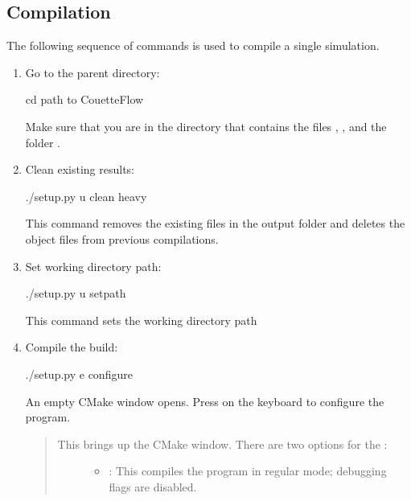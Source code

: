 \documentclass[letterpaper,10pt,english]{sphinxmanual}
\begin{document}
\subsection{Compilation}
\label{\detokenize{setup:compilation}}\label{\detokenize{setup:id2}}
The following sequence of commands is used to compile a single simulation.
\begin{enumerate}
\item {} 
Go to the parent directory:

\begin{sphinxVerbatim}[commandchars=\\\{\}]
\PYGZdl{} cd \PYGZlt{}path to \textbar{}CouetteFlow\textbar{}\PYGZgt{}
\end{sphinxVerbatim}

Make sure that you are in the directory that contains the files , , and the folder .

\item {} 
Clean existing results:

\begin{sphinxVerbatim}[commandchars=\\\{\}]
\PYGZdl{} ./setup.py \PYGZhy{}u clean heavy
\end{sphinxVerbatim}

This command removes the existing files in the output folder  and deletes the object files from previous compilations. 

\item {} 
Set working directory path:

\begin{sphinxVerbatim}[commandchars=\\\{\}]
\PYGZdl{} ./setup.py \PYGZhy{}u set\PYGZus{}path
\end{sphinxVerbatim}

This command sets the working directory path

\item {} 
Compile the build:

\begin{sphinxVerbatim}[commandchars=\\\{\}]
\PYGZdl{} ./setup.py \PYGZhy{}e configure
\end{sphinxVerbatim}

An empty CMake window opens. Press \sphinxcode{{[}c{]}} on the keyboard to configure the program.
\begin{quote}
\begin{description}
\item[{This brings up the CMake window. There are two options for the  :}] \leavevmode\begin{itemize}
\item {} 
: This compiles the program in regular mode; debugging flags are disabled.


\end{itemize}
\end{description}
\end{quote}
\end{enumerate}
\end{document}
